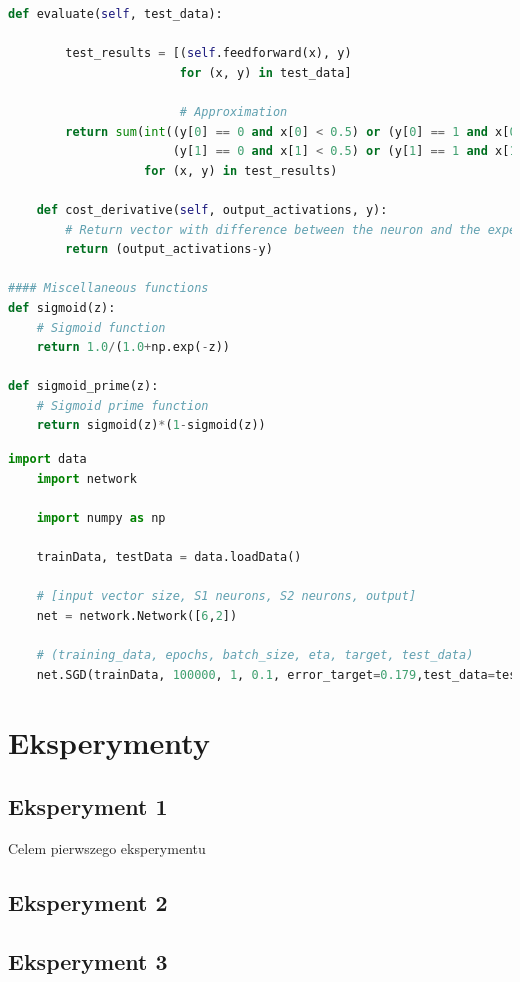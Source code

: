 \documentclass[12pt,twoside]{article}
\begin{document}
\begin{lstlisting}[caption={Plik zawierający sieć - network.py},label={Lst:network_py},language=Python,basicstyle=\scriptsize]
    def evaluate(self, test_data):

        test_results = [(self.feedforward(x), y)
                        for (x, y) in test_data]

                        # Approximation
        return sum(int((y[0] == 0 and x[0] < 0.5) or (y[0] == 1 and x[0] > 0.5) and 
                       (y[1] == 0 and x[1] < 0.5) or (y[1] == 1 and x[1] > 0.5)) 
                   for (x, y) in test_results)

    def cost_derivative(self, output_activations, y):
        # Return vector with difference between the neuron and the expected result
        return (output_activations-y)

#### Miscellaneous functions
def sigmoid(z):
    # Sigmoid function
    return 1.0/(1.0+np.exp(-z))

def sigmoid_prime(z):
    # Sigmoid prime function
    return sigmoid(z)*(1-sigmoid(z))


\end{lstlisting}

\begin{lstlisting}[caption={Plik wywołujący przykładową sieć - main.py},label={Lst:main_py},language=Python,basicstyle=\scriptsize]
	import data
	import network
	
	import numpy as np
	
	trainData, testData = data.loadData()
	
	# [input vector size, S1 neurons, S2 neurons, output]
	net = network.Network([6,2])
	
	# (training_data, epochs, batch_size, eta, target, test_data)
	net.SGD(trainData, 100000, 1, 0.1, error_target=0.179,test_data=testData)
\end{lstlisting}

\clearpage	

\section{Eksperymenty}
\subsection{Eksperyment 1}
Celem pierwszego eksperymentu

\subsection{Eksperyment 2}
\subsection{Eksperyment 3}
\end{document}
